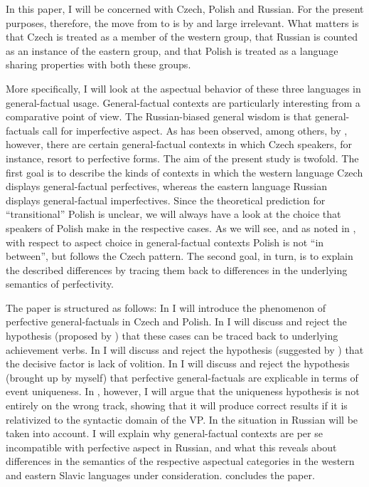 \documentclass[output=paper,modfonts,newtxmath,hidelinks]{langscibook}
\begin{document}
In this paper, I will be concerned with Czech, Polish and Russian. 
For the present purposes, therefore, the move from \citet{Dickey2000} to \citet{Dickey15} is by and large irrelevant. 
What matters is that Czech is treated as a member of 
the western group, that Russian is counted as an instance of the eastern group, 
and that Polish is treated as a language sharing properties with both these groups.

More specifically, I will look at the aspectual behavior of these three languages in general-factual usage.
General-factual contexts are particularly interesting from a comparative point of view.
The Russian-biased general wisdom is that general-factuals call for imperfective aspect. As has been observed, among others, by \citet{Dickey2000}, however, 
there are certain general-factual contexts in which Czech speakers, for instance, resort to perfective forms.  
The aim of the present study is twofold. The first goal is to describe the kinds of contexts in which the western language Czech displays general-factual perfectives, whereas 
the eastern language Russian displays general-factual imperfectives. Since the theoretical prediction for ``transitional'' Polish is unclear, 
we will always have a look at the choice that speakers of Polish 
make in the respective cases. As we will see, and as noted in 
\citet[101]{Dickey2000}, with respect to aspect choice in general-factual contexts Polish is not ``in between'', but 
follows the Czech pattern.  
The second goal, in turn, is to explain the described differences by tracing them back to differences in the underlying 
semantics of perfectivity. 

The paper is structured as follows: 
In  I will introduce the phenomenon of perfective general-factuals in Czech and Polish. 
In  I will discuss and reject the hypothesis (proposed by \citealt{Dickey2000}) that these cases can be traced back to underlying achievement verbs. 
In  I will discuss and reject the hypothesis (suggested by \citealt{Cummins1987}) that the decisive factor is lack of volition. 
In  I will discuss and reject the hypothesis (brought up by myself) that perfective general-factuals are explicable in terms of event uniqueness.
In , however, I will argue that the uniqueness hypothesis is not entirely on the wrong track, showing that 
it will produce correct results if it is relativized to the syntactic domain of the VP.
In  the situation in Russian will be taken into account. I will explain why general-factual contexts are per se incompatible
with perfective aspect in Russian, and what this reveals about differences in the semantics of the respective aspectual categories
in the western and eastern Slavic languages under consideration. 
 concludes the paper. 
\end{document}
